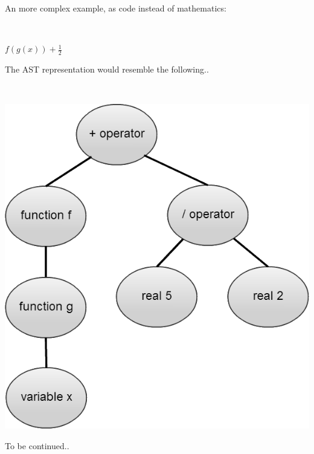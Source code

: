 \documentclass[titlepage]{article}
\begin{document}
			An more complex example, as code instead of mathematics:
			\newline

			~\centerline{\Large{$f(g(x)) + \frac{1}{2}$}}
			\newline

			The AST representation would resemble the following..
			\footnotemark[\value{footnote}]
			\newline

			~\centerline{\includegraphics[scale=.5]{PseudocodeAST.png}}
			\newline

			To be continued..
\end{document}
